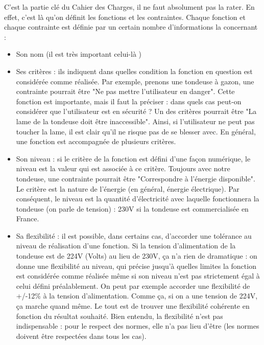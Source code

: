 C'est la partie clé du Cahier des Charges, il ne faut absolument pas la rater. En effet, c'est là qu'on définit les fonctions et les contraintes.
Chaque fonction et chaque contrainte est définie par un certain nombre d'informations la concernant :\\
\begin{itemize}
  \item Son nom (il est très important celui-là )\\
  \item Ses critères : ils indiquent dans quelles condition la fonction en question est considérée comme réalisée.
    Par exemple, prenons une tondeuse à gazon, une contrainte pourrait être "Ne pas mettre l'utilisateur en danger". 
    Cette fonction est importante, mais il faut la préciser : dans quels cas peut-on considérer que l'utilisateur est en sécurité ? 
    Un des critères pourrait être "La lame de la tondeuse doit être inaccessible". Ainsi, si l'utilisateur ne peut pas toucher la lame, il est clair qu'il ne risque pas de se blesser avec. 
    En général, une fonction est accompagnée de plusieurs critères.\\
  \item Son niveau : si le critère de la fonction est défini d'une façon numérique, le niveau est la valeur qui est associée à ce critère. 
    Toujours avec notre tondeuse, une contrainte pourrait être "Correspondre à l'énergie disponible". 
    Le critère est la nature de l'énergie (en général, énergie électrique). 
    Par conséquent, le niveau est la quantité d'électricité avec laquelle fonctionnera la tondeuse (on parle de tension) : 230V si la tondeuse est commercialisée en France.\\
  \item Sa flexibilité : il est possible, dans certains cas, d'accorder une tolérance au niveau de réalisation d'une fonction. 
    Si la tension d'alimentation de la tondeuse est de 224V (Volts) au lieu de 230V, ça n'a rien de dramatique : on donne une flexibilité au niveau, 
    qui précise jusqu'à quelles limites la fonction est considérée comme réalisée même si son niveau n'est pas strictement égal à celui défini préalablement. 
    On peut par exemple accorder une flexibilité de +/-12\% à la tension d'alimentation. Comme ça, si on a une tension de 224V, ça marche quand même. 
    Le tout est de trouver une flexibilité cohérente en fonction du résultat souhaité. Bien entendu, la flexibilité n'est pas indispensable : pour le respect des normes, elle n'a pas lieu d'être (les normes doivent être respectées dans tous les cas).\\
\end{itemize}

